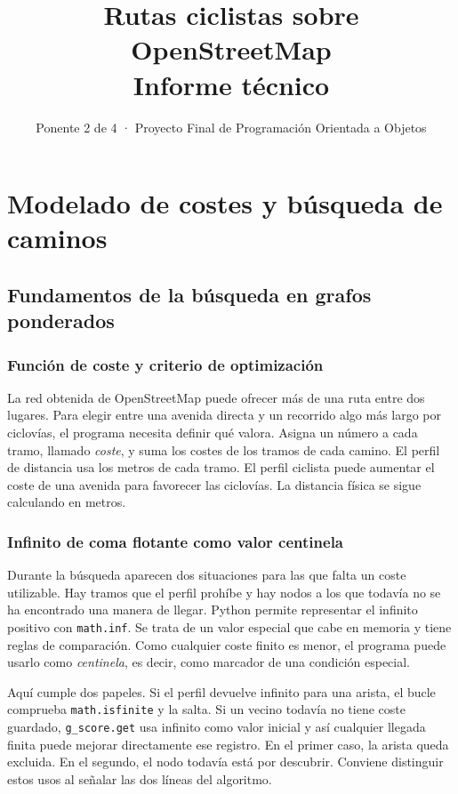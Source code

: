 \documentclass[11pt,a4paper]{article}
\title{Rutas ciclistas sobre OpenStreetMap\\Informe técnico}
\author{Ponente 2 de 4 · Proyecto Final de Programación Orientada a Objetos}
\date{}
\begin{document}
\maketitle
\setcounter{section}{1}
\section{Modelado de costes y búsqueda de caminos}

\subsection{Fundamentos de la búsqueda en grafos ponderados}

\subsubsection{Función de coste y criterio de optimización}
La red obtenida de OpenStreetMap puede ofrecer más de una ruta entre dos lugares. Para elegir entre una avenida directa y un recorrido algo más largo por ciclovías, el programa necesita definir qué valora. Asigna un número a cada tramo, llamado \emph{coste}, y suma los costes de los tramos de cada camino. El perfil de distancia usa los metros de cada tramo. El perfil ciclista puede aumentar el coste de una avenida para favorecer las ciclovías. La distancia física se sigue calculando en metros.

\subsubsection{Infinito de coma flotante como valor centinela}
Durante la búsqueda aparecen dos situaciones para las que falta un coste utilizable. Hay tramos que el perfil prohíbe y hay nodos a los que todavía no se ha encontrado una manera de llegar. Python permite representar el infinito positivo con \texttt{math.inf}. Se trata de un valor especial que cabe en memoria y tiene reglas de comparación. Como cualquier coste finito es menor, el programa puede usarlo como \emph{centinela}, es decir, como marcador de una condición especial.

Aquí cumple dos papeles. Si el perfil devuelve infinito para una arista, el bucle comprueba \texttt{math.isfinite} y la salta. Si un vecino todavía no tiene coste guardado, \texttt{g\_score.get} usa infinito como valor inicial y así cualquier llegada finita puede mejorar directamente ese registro. En el primer caso, la arista queda excluida. En el segundo, el nodo todavía está por descubrir. Conviene distinguir estos usos al señalar las dos líneas del algoritmo.
\end{document}
